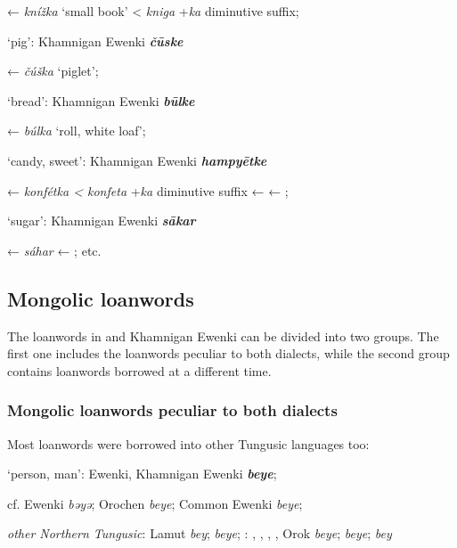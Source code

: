 \documentclass[output=paper,colorlinks,citecolor=brown]{langscibook}
\begin{document}
    ←  \textit{knížka} ‘small book’ < \textit{kniga} +\textit{ka}  diminutive suffix;

    \ex ‘pig’: Khamnigan Ewenki \textbf{\textit{čūske}}

    ←  \textit{čúška} `piglet';

    \ex ‘bread’: Khamnigan Ewenki \textbf{\textit{būlke}}

    ←  \textit{búlka} ‘roll, white loaf’;

    \ex ‘candy, sweet’: Khamnigan Ewenki \textbf{\textit{hampyētke}}

    ←  \textit{konfétka < konfeta} +\textit{ka}  diminutive suffix ←  ← ;

    \ex ‘sugar’: Khamnigan Ewenki \textbf{\textit{sākar}}

    ←  \textit{sáhar} ← ; etc.
\z
\z


\subsection{Mongolic loanwords}

The  loanwords in  and Khamnigan Ewenki can be divided into two groups. The first one includes the  loanwords peculiar to both dialects, while the second group contains loanwords borrowed at a different time.

\subsubsection{Mongolic loanwords peculiar to both dialects}


\ea
Most  loanwords were borrowed into other Tungusic languages too:

\ea ‘person, man’:  Ewenki, Khamnigan Ewenki \textbf{\textit{beye}};

    cf.  Ewenki \textit{bǝyǝ}; Orochen \textit{beye};  Common Ewenki \textit{beye};

    \textit{other Northern Tungusic}: Lamut \textit{bey};  \textit{beye}; \textit{}: , , , , Orok \textit{beye};  \textit{beye};  \textit{bey} 
    
\end{document}
